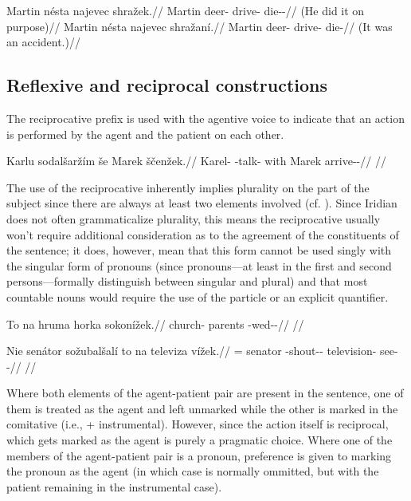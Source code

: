 \pex
\a
\begingl
	\gla Martin nésta najevec shražek.//
	\glb Martin deer-\Pat{} drive-\Cv{} die-\Av{}-\Pf{}//
	\glft {} (He did it on purpose)//
\endgl
\a
\begingl
	\gla Martin nésta najevec shražaní.//
	\glb Martin deer-\Pat{} drive-\Cv{} die-//
	\glft {} (It was an accident.)//
\endgl
\xe

\subsection{Reflexive and reciprocal constructions}

The reciprocative prefix  is used with the agentive voice to indicate that an action is performed by the agent and the patient on each other.

\pex
\begingl
\gla Karlu sodalšar\v{z}ím še Marek ščenžek.//
\glb Karel-\Ins{} \Rec{}-talk- with Marek arrive-\Av{}-\Pf{}//
\glft {}//
\endgl
\xe

The use of the reciprocative inherently implies plurality on the part of the subject since there are always at least two elements involved (cf. \cite[255]{tesniere1965}). Since Iridian does not often grammaticalize plurality, this means the reciprocative usually won't require additional consideration as to the agreement of the constituents of the sentence; it does, however, mean that this form cannot be used singly with the singular form of pronouns (since pronouns---at least in the first and second persons---formally distinguish between singular and plural) and that most countable nouns would require the use of the particle  or an explicit quantifier.

\pex
\begingl
\gla To na hruma horka sokonížek.//
\glb \Dem{} \Loc{} church-\Pat{} parents \Rec{}-wed-\Av{}-\Pf{}//
\glft {}//
\endgl
\xe

\pex
\begingl
\gla Nie senátor sožubalšalí to na televiza vížek.//
\glb \Pl{}= senator \Rec{}-shout-\Av{}-\Prog{}  \Loc{} television-\Pat{} see-\Av{}-\Pf{}//
\glft {}//
\endgl
\xe

Where both elements of the agent-patient pair are present in the sentence, one of them is treated as the agent and left unmarked while the other is marked in the comitative (i.e.,  + instrumental). However, since the action itself is reciprocal, which gets marked as the agent is purely a pragmatic choice. Where one of the members of the agent-patient pair is a pronoun, preference is given to marking the pronoun as the agent (in which case  is normally ommitted, but with the patient remaining in the instrumental case).

